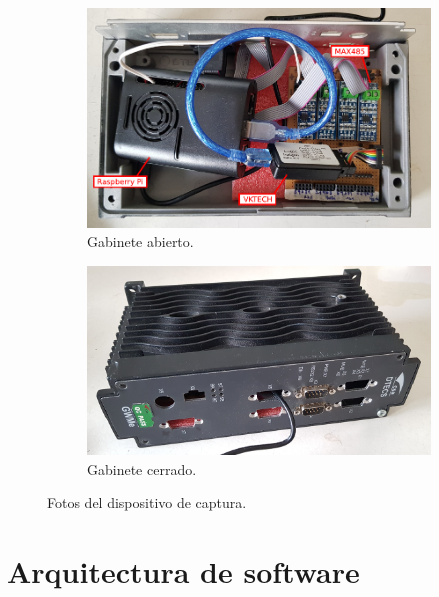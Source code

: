 \begin{figure}[htbp]
	\centering
    \begin{subfigure}[b]{1\textwidth}
        \centering
        \includegraphics[width=1\textwidth]{./Figures/foto-dispositivo.pdf}
        \caption{Gabinete abierto.}
    \end{subfigure}
    \begin{subfigure}[b]{1\textwidth}
        \centering
        \includegraphics[width=1\textwidth]{./Figures/disp-captura-cerrado.jpg}
        \caption{Gabinete cerrado.}
    \end{subfigure}
	\caption{Fotos del dispositivo de captura.}
    \label{fig:fotodispositivo}
\end{figure}

\clearpage

\section{Arquitectura de software}
\label{sec:software}


